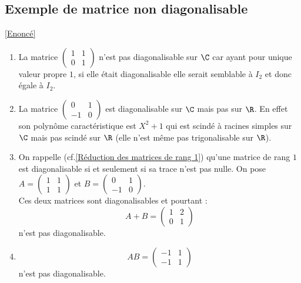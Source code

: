 \documentclass[8pt]{book}
\begin{document}
	\subsection{Exemple de matrice non diagonalisable }
	\label{Exemple de matrice non diagonalisable corrigé}
	\textcolor{blue}{\hyperref[Exemple de matrice non diagonalisable]{[Enoncé]}}\\
	\begin{enumerate}[leftmargin=*]
		\item La matrice $\begin{pmatrix}
			1&1\\0&1
		\end{pmatrix}$ n'est pas diagonalisable sur $\C$ car ayant pour unique valeur propre $1$, si elle était diagonalisable elle serait semblable à $I_2$ et donc égale à $I_2$.
		\item La matrice $\begin{pmatrix}
			0&1\\-1&0
		\end{pmatrix}$ est diagonalisable sur $\C$ mais pas sur $\R$. En effet son polynôme caractéristique est $X^2+1$ qui est scindé à racines simples sur $\C$ mais pas scindé sur $\R$ (elle n'est même pas trigonalisable sur $\R$).
		\item On rappelle (cf.\ref{Réduction des matrices de rang 1}) qu'une matrice de rang $1$ est diagonalisable si et seulement si sa trace n'est pas nulle.
		On pose $A=\begin{pmatrix}
			1&1\\1&1
		\end{pmatrix}$ et $B=\begin{pmatrix}
		0&1\\-1&0
		\end{pmatrix}$.\\ Ces deux matrices sont diagonalisables et pourtant : \[A+B=\begin{pmatrix}
		1&2\\0&1
		\end{pmatrix}\]
		n'est pas diagonalisable.
		\item \[AB=\begin{pmatrix}
			-1&1\\
			-1&1
		\end{pmatrix}\]
		n'est pas diagonalisable.
	\end{enumerate}
	
\end{document}

